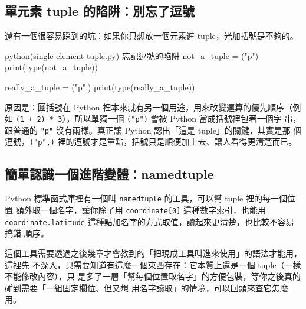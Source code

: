 
\subsection*{單元素 tuple 的陷阱：別忘了逗號}

還有一個很容易踩到的坑：如果你只想放一個元素進 tuple，光加括號是不夠的。

\begin{example}{python}{(single-element-tuple.py) 忘記逗號的陷阱}
not_a_tuple = ("p")
print(type(not_a_tuple))

really_a_tuple = ("p",)
print(type(really_a_tuple))
\end{example}


原因是：圓括號在 Python 裡本來就有另一個用途，用來改變運算的優先順序（例如
\texttt{(1 + 2) * 3}），所以單獨一個 \texttt{("p")} 會被 Python 當成括號裡包著一個字
串，跟普通的 \texttt{"p"} 沒有兩樣。真正讓 Python 認出「這是 tuple」的關鍵，其實是那
個逗號，\texttt{("p",)} 裡的逗號才是重點，括號只是順便加上去、讓人看得更清楚而已。

\subsection*{簡單認識一個進階變體：namedtuple}

Python 標準函式庫裡有一個叫 \texttt{namedtuple} 的工具，可以幫 tuple 裡的每一個位置
額外取一個名字，讓你除了用 \texttt{coordinate[0]} 這種數字索引，也能用
\texttt{coordinate.latitude} 這種點加名字的方式取值，讀起來更清楚，也比較不容易搞錯
順序。

這個工具需要透過之後幾章才會教到的「把現成工具叫進來使用」的語法才能用，這裡先
不深入，只需要知道有這麼一個東西存在：它本質上還是一個 tuple（一樣不能修改內容），只
是多了一層「幫每個位置取名字」的方便包裝，等你之後真的碰到需要「一組固定欄位、但又想
用名字讀取」的情境，可以回頭來查它怎麼用。

